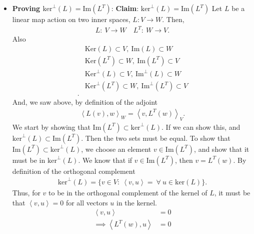 \documentclass{report}
\begin{document}
\begin{itemize}
        \item \textbf{Proving $\text{ker}^{\perp}(L) = \text{Im}(L^{T})$}:
            \bigbreak \noindent 
            \textbf{Claim}: $\text{ker}^{\perp}(L) = \text{Im}(L^{T})$
            \bigbreak \noindent 
            Let $L$ be a linear map action on two inner spaces, $L: V \to W$. Then,
            \begin{align*}
                L:\ V \to W \quad L^{T}:\ W \to V   
            .\end{align*}
            Also
            \begin{align*}
                &\text{Ker}(L) \subset V, \ \text{Im}(L) \subset W \\
                &\text{Ker}(L^{T}) \subset W, \ \text{Im}(L^{T}) \subset V \\
                &\text{Ker}^{\perp}(L) \subset V ,\ \text{Im}^{\perp}(L) \subset W \\
                &\text{Ker}^{\perp}(L^{T}) \subset W ,\ \text{Im}^{\perp}(L^{T}) \subset V \\
            .\end{align*}
            And, we saw above, by definition of the adjoint
            \begin{align*}
                \left\langle L(v), w \right\rangle_{W} = \left\langle v, L^{T}(w) \right\rangle_{V}
            .\end{align*}
            We start by showing that $\text{Im}(L^{T}) \subset \text{ker}^{\perp}(L)$. If we can show this, and $\text{ker}^{\perp}(L) \subset \text{Im}(L^{T})$. Then the two sets must be equal. To show that $\text{Im}(L^{T}) \subset \text{ker}^{\perp}(L)$, we choose an element $v\in \text{Im}(L^{T})$, and show that it must be in $\text{ker}^{\perp}(L)$. We know that if $v\in \text{Im}(L^{T})$, then $v=L^{T}(w)$. By definition of the orthogonal complement
            \begin{align*}
                \text{ker}^{\perp}(L) = \{v\in V:\ \left\langle v,u \right\rangle = \ \forall \ u\in \text{ker}(L)\}
            .\end{align*}
            Thus, for $v$ to be in the orthogonal complement of the kernel of $L$, it must be that $\left\langle v,u \right\rangle  = 0 $ for all vectors $u$ in the kernel.
            \begin{align*}
                \left\langle v,u \right\rangle &= 0 \\
                \implies \left\langle L^{T}(w), u \right\rangle &= 0 \\

\end{align*}
\end{itemize}
\end{document}
